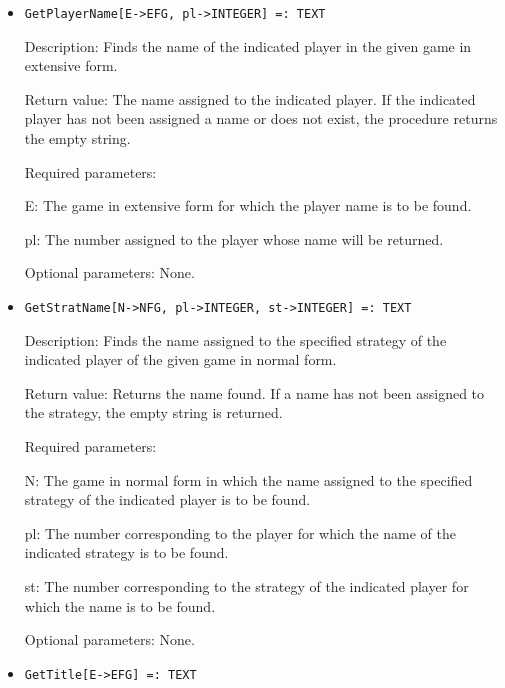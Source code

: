 \begin{itemize}
\item
\protect \large \begin{verbatim}
GetPlayerName[E->EFG, pl->INTEGER] =: TEXT
\end{verbatim}\normalsize

\bd
\item
[Description:] Finds the name of the indicated player in the given
game in extensive form.
\item
[Return value:] The name assigned to the indicated player.  If the
indicated player has not been assigned a name or does not exist, the
procedure returns the empty string.
\item
[Required parameters:]\hfil\null

\bd
\item  
[E:] The game in extensive form for which the player name is to be
found.
\item
[pl:] The number assigned to the player whose name will be returned.
\ed

\item
[Optional parameters:] None.
\ed

\item
\protect \large \begin{verbatim}
GetStratName[N->NFG, pl->INTEGER, st->INTEGER] =: TEXT
\end{verbatim}\normalsize

\bd
\item
[Description:] Finds the name assigned to the specified strategy of
the indicated player of the given game in normal form.
\item
[Return value:] Returns the name found.  If a name has not been
assigned to the strategy, the empty string is returned.
\item
[Required parameters:]\hfil\null

\bd
\item
[N:] The game in normal form in which the name assigned to the
specified strategy of the indicated player is to be found.
\item
[pl:] The number corresponding to the player for which the name of the
indicated strategy is to be found.
\item
[st:] The number corresponding to the strategy of the indicated player
for which the name is to be found.
\ed

\item
[Optional parameters:] None.
\ed

\item
\protect \large \begin{verbatim}
GetTitle[E->EFG] =: TEXT
\end{verbatim}\normalsize


\end{itemize}
